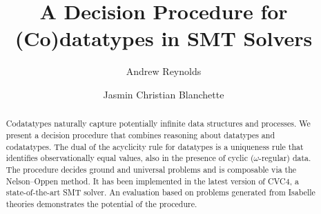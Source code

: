 \newcommand\Types{\mathcal{Y}}
\newcommand\Funcs{\mathcal{F}}

\newcommand\Data{\Types_{\mathrm{dt}}}
\newcommand\Codata{\Types_{\mathrm{codt}}}
\newcommand\Nondata{\Types_{\mathrm{ord}}}

\newcommand\Ctr{\Funcs_{\mathrm{ctr}}}
\newcommand\Sel{\Funcs_{\mathrm{sel}}}

\newcommand\vvthinspace{\kern+0.041667em}
\newcommand\vthinspace{\kern+0.083333em}
\newcommand\negvthinspace{\kern-0.083333em}

\usepackage[
   a4paper,
   pdftex,
   pdftitle={A Decision Procedure for (Co)datatypes in SMT Solvers},
   pdfauthor={Andrew Reynolds and Jasmin Christian Blanchette},
   pdfkeywords={},
   pdfborder={0 0 0},
   draft=false,
   bookmarksnumbered,
   bookmarks,
   bookmarksdepth=2,
   bookmarksopenlevel=2,
   bookmarksopen]{hyperref}


\global\def\figurename{Figure}
\global\def\figuresname{Figures}


\makeatletter
\ps@myheadings
\makeatother







\title{A Decision Procedure for (Co)datatypes in SMT Solvers}

\author {Andrew Reynolds \and Jasmin Christian Blanchette}

\maketitle

\begin{abstract}
Codatatypes naturally capture potentially infinite data structures and
processes. We present a decision procedure that combines reasoning about
datatypes and codatatypes. The dual of the acyclicity rule for datatypes is a
uniqueness rule that identifies observationally equal values, also in the presence of cyclic
($\omega$-regular) data. The procedure decides ground and universal
problems and is composable via the Nelson--Oppen method. It has been
implemented in the latest version of CVC4, a state-of-the-art SMT solver. An
evaluation based on problems generated from Isabelle theories demonstrates the
potential of the procedure.
\end{abstract}


